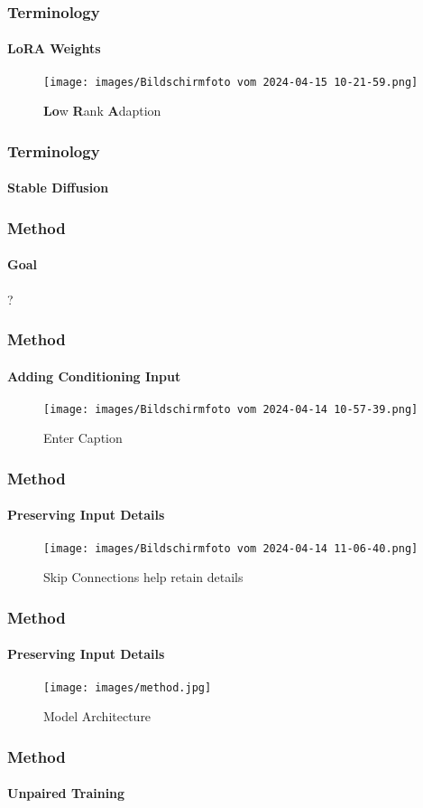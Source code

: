 \documentclass[aspectratio=169, lecture, amberg]{OTHAWbeamer}
\begin{document}
\begin{frame}
\frametitle{Terminology}
\framesubtitle{LoRA Weights}
\begin{figure}
    \centering
    \texttt{[image: images/Bildschirmfoto vom 2024-04-15 10-21-59.png]}
    \caption{\textbf{Lo}w \textbf{R}ank \textbf{A}daption}
\end{figure}
\end{frame}

\begin{frame}
\frametitle{Terminology}
\framesubtitle{Stable Diffusion}

\end{frame}

\begin{frame}
\frametitle{Method}
\framesubtitle{Goal}
?
\end{frame}

\begin{frame}
\frametitle{Method}
\framesubtitle{Adding Conditioning Input}
\begin{figure}
    \centering
    \texttt{[image: images/Bildschirmfoto vom 2024-04-14 10-57-39.png]}
    \caption{Enter Caption}
\end{figure}
\end{frame}

\begin{frame}
\frametitle{Method}
\framesubtitle{Preserving Input Details}
\begin{figure}
    \centering
    \texttt{[image: images/Bildschirmfoto vom 2024-04-14 11-06-40.png]}
    \caption{Skip Connections help retain details}
\end{figure}
\end{frame}

\begin{frame}
\frametitle{Method}
\framesubtitle{Preserving Input Details}
\begin{figure}
    \centering
    \texttt{[image: images/method.jpg]}
    \caption{Model Architecture}
\end{figure}
\end{frame}

\begin{frame}
\frametitle{Method}
\framesubtitle{Unpaired Training}

\end{frame}
\end{document}

